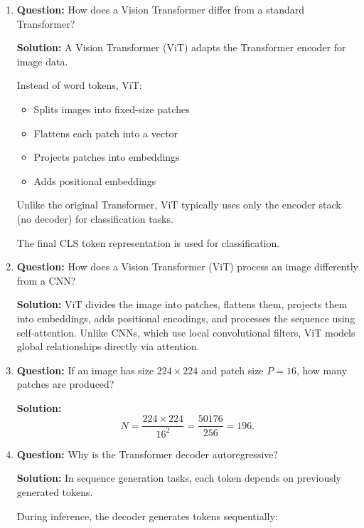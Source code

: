 \documentclass[11pt]{article}
\begin{document}
\begin{enumerate}
\begin{itemize}[nosep]
\end{itemize}

Because Transformers often operate with variable sequence lengths and small batches, layer normalization is generally preferred.

\item \textbf{Question:} How does a Vision Transformer differ from a standard Transformer?

\textbf{Solution:}
A Vision Transformer (ViT) adapts the Transformer encoder for image data.

Instead of word tokens, ViT:

\begin{itemize}[nosep]

\item Splits images into fixed-size patches
\item Flattens each patch into a vector
\item Projects patches into embeddings
\item Adds positional embeddings

\end{itemize}

Unlike the original Transformer, ViT typically uses only the encoder stack (no decoder) for classification tasks.

The final CLS token representation is used for classification.

\item \textbf{Question:}
How does a Vision Transformer (ViT) process an image differently from a CNN?

\textbf{Solution:}
ViT divides the image into patches, flattens them, projects them into embeddings, adds positional encodings, and processes the sequence using self-attention. Unlike CNNs, which use local convolutional filters, ViT models global relationships directly via attention.

\item \textbf{Question:}
If an image has size $224 \times 224$ and patch size $P=16$, how many patches are produced?

\textbf{Solution:}
\[
N = \frac{224 \times 224}{16^2}
= \frac{50176}{256}
= 196.
\]

\item \textbf{Question:} Why is the Transformer decoder autoregressive?

\textbf{Solution:}
In sequence generation tasks, each token depends on previously generated tokens.

During inference, the decoder generates tokens sequentially:


\end{enumerate}
\end{document}
